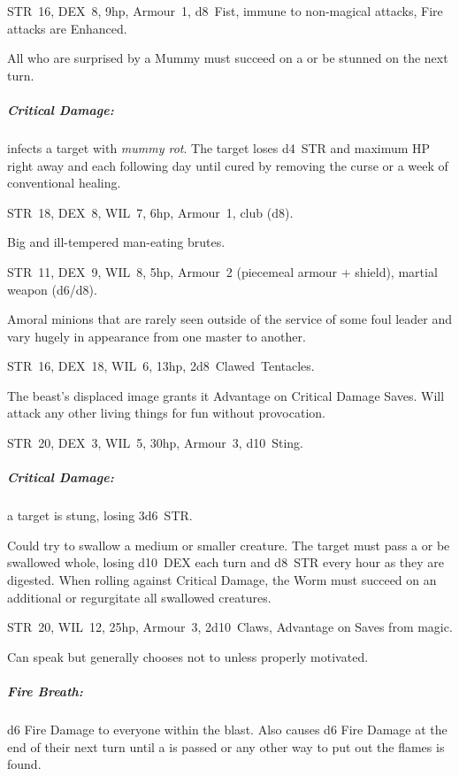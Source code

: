 \documentclass[itdr]{subfiles}
\begin{document}
\vfill

STR~16, DEX~8, 9hp, Armour~1, d8~Fist, immune to non-magical attacks, Fire attacks are Enhanced.

All who are surprised by a Mummy must succeed on a  or be stunned on the next turn.

\subparagraph{Critical Damage:} infects a target with {\em mummy rot}. The target loses d4~STR and maximum HP right away and each following day until cured by removing the curse or a week of conventional healing.

\vfill

STR~18, DEX~8, WIL~7, 6hp, Armour~1, club (d8).

Big and ill-tempered man-eating brutes.

\vfill

STR~11, DEX~9, WIL~8, 5hp, Armour~2 (piecemeal armour + shield), martial weapon (d6/d8).

Amoral minions that are rarely seen outside of the service of some foul leader and vary hugely in appearance from one master to another.

\vfill

STR~16, DEX~18, WIL~6, 13hp, 2d8~Clawed~Tentacles.

The beast's displaced image grants it Advantage on Critical Damage Saves. Will attack any other living things for fun without provocation.

\vfill
\break

\vfill
{}

STR~20, DEX~3, WIL~5, 30hp, Armour~3, d10~Sting.

\subparagraph{Critical Damage:} a target is stung, losing 3d6~STR.

Could try to swallow a medium or smaller creature. The target must pass a  or be swallowed whole, losing d10~DEX each turn and d8~STR every hour as they are digested. When rolling against Critical Damage, the Worm must succeed on an additional  or regurgitate all swallowed creatures.

\vfill

STR~20, WIL~12, 25hp, Armour~3, 2d10~Claws, Advantage on Saves from magic.

Can speak but generally chooses not to unless properly motivated.

\subparagraph{Fire Breath:} d6 Fire Damage to everyone within the blast. Also causes d6 Fire Damage at the end of their next turn until a  is passed or any other way to put out the flames is found.
\end{document}
